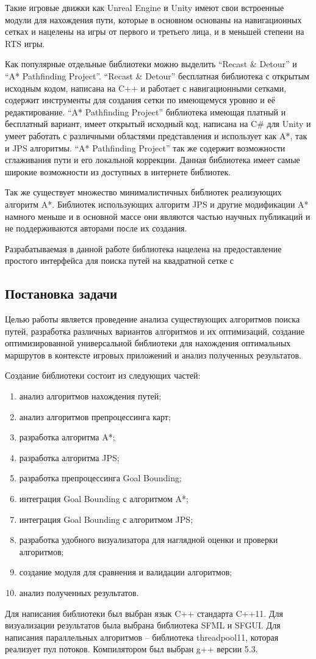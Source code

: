 Такие игровые движки как Unreal Engine и Unity имеют свои встроенные модули для нахождения пути, которые в основном основаны на навигационных сетках и нацелены на игры от первого и третьего лица, и в меньшей степени на RTS игры. 

Как популярные отдельные библиотеки можно выделить ``Recast \& Detour'' и ``A* Pathfinding Project''. ``Recast \& Detour'' бесплатная библиотека с открытым исходным кодом, написана на C++ и работает с навигационными сетками, содержит инструменты для создания сетки по имеющемуся уровню и её редактирование. ``A* Pathfinding Project'' библиотека имеющая платный и бесплатный вариант, имеет открытый исходный код, написана на C\# для Unity и умеет работать с различными областями представления и использует как A*, так и JPS алгоритмы. ``A* Pathfinding Project'' так же содержит возможности сглаживания пути и его локальной коррекции. Данная библиотека имеет самые широкие возможности из доступных в интернете библиотек.

Так же существует множество минималистичных библиотек реализующих алгоритм A*. Библиотек использующих алгоритм JPS и другие модификации A* намного меньше и в основной массе они являются частью научных публикаций и не поддерживаются авторами после их создания. 
 
Разрабатываемая в данной работе библиотека нацелена на предоставление простого интерфейса для поиска путей на квадратной сетке с 

\subsection{Постановка задачи}

Целью работы является проведение анализа существующих алгоритмов поиска путей, разработка различных вариантов алгоритмов и их оптимизаций, создание оптимизированной универсальной библиотеки для нахождения оптимальных маршрутов в контексте игровых приложений и анализ полученных результатов. 

Создание библиотеки состоит из следующих частей:

\begin{enumerate}
    \item анализ алгоритмов нахождения путей;
    \item анализ алгоритмов препроцессинга карт;
    \item разработка алгоритма A*;
    \item разработка алгоритма JPS;
    \item разработка препроцессинга Goal Bounding;
    \item интеграция Goal Bounding с алгоритмом A*;
    \item интеграция Goal Bounding с алгоритмом JPS;
    \item разработка удобного визуализатора для наглядной оценки и проверки алгоритмов;
    \item создание модуля для сравнения и валидации алгоритмов;
    \item анализ полученных результатов.
\end{enumerate}

Для написания библиотеки был выбран язык C++ стандарта C++11. Для визуализации результатов была выбрана библиотека SFML и SFGUI. Для написания параллельных алгоритмов -- библиотека threadpool11, которая реализует пул потоков. Компилятором был выбран g++ версии 5.3.